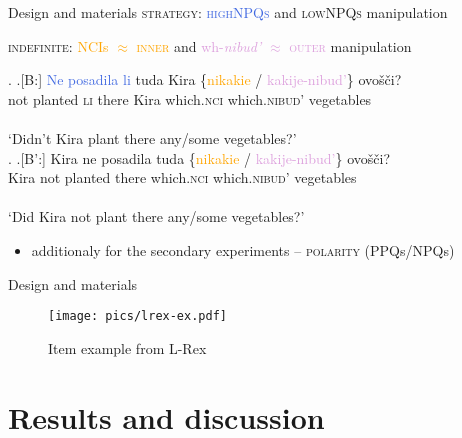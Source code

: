\documentclass[xcolor=dvipsnames]{beamer}
\begin{document}
\begin{frame}{Design and materials}
    \textsc{strategy}: \textcolor{RoyalBlue}{\textsc{highNPQs}} and 
    \textcolor{WildStrawberry}{\textsc{lowNPQs}} manipulation

    \vspace{1em}
    \textsc{indefinite}: \textcolor{Orange}{NCIs $\approx$ \textsc{inner}} and 
    \textcolor{Plum}{wh-\textit{nibud'} $\approx$ \textsc{outer}} manipulation

    \vspace{1em}
\begin{footnotesize}
    \ex. \ag.[B:] \textcolor{RoyalBlue}{Ne} \textcolor{RoyalBlue}{posadila} \textcolor{RoyalBlue}{li}
     tuda Kira \{\textcolor{Orange}{nikakie} / \textcolor{Plum}{kakije-nibud'}\} ovošči? \\
    not planted \textsc{li} there Kira which.\textsc{nci} {} which.\textsc{nibud'}  vegetables \\\\
    `Didn't Kira plant there any/some vegetables?' \\
    \z.
    \ag.[B':] Kira \textcolor{WildStrawberry}{ne} \textcolor{WildStrawberry}{posadila} tuda
    \{\textcolor{Orange}{nikakie} / \textcolor{Plum}{kakije-nibud'}\} ovošči? \\
    Kira not planted there which.\textsc{nci} {} which.\textsc{nibud'} vegetables \\\\
    `Did Kira not plant there any/some vegetables?' 
    \par 
\end{footnotesize}
\pause 
\begin{small}
    \begin{itemize}
        \item additionaly for the secondary experiments -- \textsc{polarity} (PPQs/NPQs)
    \end{itemize}
\end{small}

\end{frame}

\begin{frame}{Design and materials}
    \begin{figure}[h]
        \texttt{[image: pics/lrex-ex.pdf]}
        \caption{Item example from L-Rex}
    \end{figure}
\end{frame}

\section{Results and discussion} 
\end{document}
